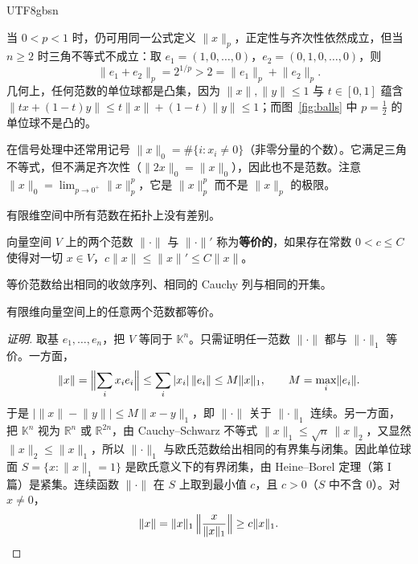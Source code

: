 \documentclass[11pt]{article}
\newcommand{\K}{\mathbb{K}}
\newcommand{\R}{\mathbb{R}}
\newcommand{\norm}[1]{\lVert #1\rVert}
\begin{document}
\begin{CJK*}{UTF8}{gbsn}
\begin{example}[$0<p<1$ 时不是范数]\label{ex:p-less-1}
当 $0<p<1$ 时，仍可用同一公式定义 $\norm{x}_{p}$，正定性与齐次性依然成立，但当 $n\ge2$ 时三角不等式不成立：取 $e_{1}=(1,0,\dots,0)$，$e_{2}=(0,1,0,\dots,0)$，则
\[
\norm{e_{1}+e_{2}}_{p}=2^{1/p}>2=\norm{e_{1}}_{p}+\norm{e_{2}}_{p}.
\]
几何上，任何范数的单位球都是凸集，因为 $\norm{x},\norm{y}\le1$ 与 $t\in[0,1]$ 蕴含 $\norm{tx+(1-t)y}\le t\norm{x}+(1-t)\norm{y}\le1$；而图~\ref{fig:balls} 中 $p=\tfrac12$ 的单位球不是凸的。

在信号处理中还常用记号 $\norm{x}_{0}=\#\{i:x_{i}\ne0\}$（非零分量的个数）。它满足三角不等式，但不满足齐次性（$\norm{2x}_{0}=\norm{x}_{0}$），因此也不是范数。注意 $\norm{x}_{0}=\lim_{p\to0^{+}}\norm{x}_{p}^{p}$，它是 $\norm{x}_{p}^{p}$ 而不是 $\norm{x}_{p}$ 的极限。
\end{example}

有限维空间中所有范数在拓扑上没有差别。

\begin{definition}[等价范数]
向量空间 $V$ 上的两个范数 $\norm{\cdot}$ 与 $\norm{\cdot}'$ 称为\textbf{等价的}，如果存在常数 $0<c\le C$ 使得对一切 $x\in V$，$c\norm{x}\le\norm{x}'\le C\norm{x}$。
\end{definition}

等价范数给出相同的收敛序列、相同的 Cauchy 列与相同的开集。

\begin{theorem}\label{thm:finite-dim}
有限维向量空间上的任意两个范数都等价。
\end{theorem}

\begin{proof}[证明]
取基 $e_{1},\dots,e_{n}$，把 $V$ 等同于 $\K^{n}$。只需证明任一范数 $\norm{\cdot}$ 都与 $\norm{\cdot}_{1}$ 等价。一方面，
\[
\norm{x}=\Bigl\|\sum_{i}x_{i}e_{i}\Bigr\|\le\sum_{i}|x_{i}|\,\norm{e_{i}}\le M\norm{x}_{1},\qquad M=\max_{i}\norm{e_{i}} .
\]
于是 $\bigl|\norm{x}-\norm{y}\bigr|\le M\norm{x-y}_{1}$，即 $\norm{\cdot}$ 关于 $\norm{\cdot}_{1}$ 连续。另一方面，把 $\K^{n}$ 视为 $\R^{n}$ 或 $\R^{2n}$，由 Cauchy--Schwarz 不等式 $\norm{x}_{1}\le\sqrt{n}\,\norm{x}_{2}$，又显然 $\norm{x}_{2}\le\norm{x}_{1}$，所以 $\norm{\cdot}_{1}$ 与欧氏范数给出相同的有界集与闭集。因此单位球面 $S=\{x:\norm{x}_{1}=1\}$ 是欧氏意义下的有界闭集，由 Heine--Borel 定理（第 I 篇）是紧集。连续函数 $\norm{\cdot}$ 在 $S$ 上取到最小值 $c$，且 $c>0$（$S$ 中不含 $0$）。对 $x\ne0$，
\[
\norm{x}=\norm{x}_{1}\,\Bigl\|\frac{x}{\norm{x}_{1}}\Bigr\|\ge c\norm{x}_{1}. \qedhere
\]
\end{proof}


\end{CJK*}
\end{document}
